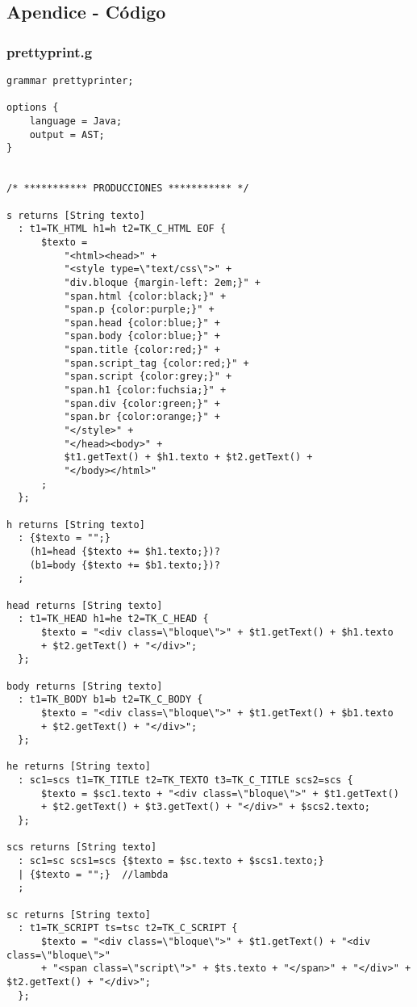 \subsection{Apendice - Código}

\subsubsection{prettyprint.g}
\texttt{}


{\scriptsize
\begin{verbatim}
grammar prettyprinter;

options {
    language = Java;
    output = AST;
}


/* *********** PRODUCCIONES *********** */

s returns [String texto]
  : t1=TK_HTML h1=h t2=TK_C_HTML EOF {
      $texto = 
          "<html><head>" + 
          "<style type=\"text/css\">" + 
          "div.bloque {margin-left: 2em;}" + 
          "span.html {color:black;}" +
          "span.p {color:purple;}" +
          "span.head {color:blue;}" +
          "span.body {color:blue;}" +
          "span.title {color:red;}" +
          "span.script_tag {color:red;}" +
          "span.script {color:grey;}" +
          "span.h1 {color:fuchsia;}" +
          "span.div {color:green;}" +
          "span.br {color:orange;}" +
          "</style>" +
          "</head><body>" +
          $t1.getText() + $h1.texto + $t2.getText() + 
          "</body></html>"
      ;
  };
  
h returns [String texto]
  : {$texto = "";} 
    (h1=head {$texto += $h1.texto;})? 
    (b1=body {$texto += $b1.texto;})?
  ;

head returns [String texto]
  : t1=TK_HEAD h1=he t2=TK_C_HEAD {
      $texto = "<div class=\"bloque\">" + $t1.getText() + $h1.texto 
      + $t2.getText() + "</div>";
  };

body returns [String texto]
  : t1=TK_BODY b1=b t2=TK_C_BODY {
      $texto = "<div class=\"bloque\">" + $t1.getText() + $b1.texto 
      + $t2.getText() + "</div>";
  };
  
he returns [String texto]
  : sc1=scs t1=TK_TITLE t2=TK_TEXTO t3=TK_C_TITLE scs2=scs {
      $texto = $sc1.texto + "<div class=\"bloque\">" + $t1.getText() 
      + $t2.getText() + $t3.getText() + "</div>" + $scs2.texto;
  };

scs returns [String texto]
  : sc1=sc scs1=scs {$texto = $sc.texto + $scs1.texto;}
  | {$texto = "";}  //lambda
  ; 

sc returns [String texto]
  : t1=TK_SCRIPT ts=tsc t2=TK_C_SCRIPT {
      $texto = "<div class=\"bloque\">" + $t1.getText() + "<div class=\"bloque\">"
      + "<span class=\"script\">" + $ts.texto + "</span>" + "</div>" + $t2.getText() + "</div>";
  };  


\end{verbatim}}
